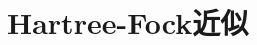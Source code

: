 \documentclass[10pt,dvipdfmx,report]{jsbook}
\begin{document}
\pagestyle{empty}

%
%
% 
%
% 

\chapter{Hartree-Fock近似}

\end{document}

